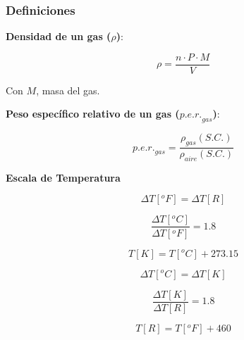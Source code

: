         \subsubsection{Definiciones}
            
        \textbf{Densidad de un gas (\(\rho\))}:
        
        \begin{quote}
        \end{quote}
        
        \begin{equation}
        \label{eq:rho}
            \rho = \frac{n \cdot P \cdot M}{V}
        \end{equation}
        
        Con \(M\), masa del gas.
        \newline
        
        \textbf{Peso específico relativo de un gas (\({p.e.r.}_{gas}\))}:
        
        \begin{quote}
        \end{quote}
        
        \begin{equation}
        \label{eq:per_gas}
            {p.e.r.}_{gas} = \frac{\rho_{gas}(S.C.)}{\rho_{aire}(S.C.)}
        \end{equation}
        
        \textbf{Escala de Temperatura}
        
        \begin{multicols}{2}
            \[\Delta T \left [ {}^{o}F \right ] = \Delta T \left [ R \right ]\]
            
            \[\frac{\Delta T \left [ {}^{o}C \right ]}{\Delta T \left [ {}^{o}F \right ]} = 1.8\]
            
            \[T \left [ K \right ] = T \left [ {}^{o}C \right ] + 273.15\]
            
            \[\Delta T \left [ {}^{o}C \right ] = \Delta T \left [ K \right ]\]
            
            \[\frac{\Delta T \left [ K \right ]}{\Delta T \left [ R \right ]} = 1.8\]
            
            \[T \left [ R \right ] = T \left [ {}^{o}F \right ] + 460\]
            
        \end{multicols}
        
